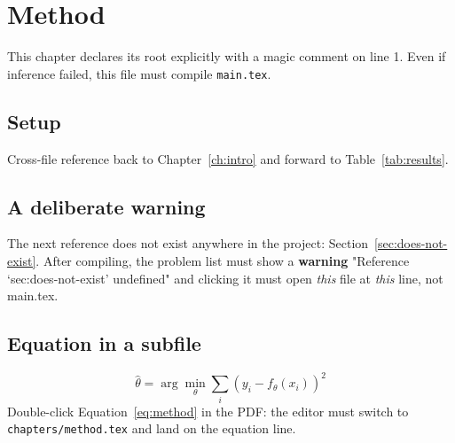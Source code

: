 \chapter{Method}\label{ch:method}

This chapter declares its root explicitly with a magic comment on line 1.
Even if inference failed, this file must compile \texttt{main.tex}.

\section{Setup}\label{sec:method-setup}
Cross-file reference back to Chapter~\ref{ch:intro} and forward to
Table~\ref{tab:results}.

\section{A deliberate warning}
The next reference does not exist anywhere in the project:
Section~\ref{sec:does-not-exist}. After compiling, the problem list must show a
\textbf{warning} "Reference `sec:does-not-exist' undefined" and clicking it must
open \emph{this} file at \emph{this} line, not main.tex.

\section{Equation in a subfile}
\begin{equation}\label{eq:method}
  \hat{\theta} = \arg\min_\theta \sum_i \left(y_i - f_\theta(x_i)\right)^2
\end{equation}
Double-click Equation~\eqref{eq:method} in the PDF: the editor must switch to
\texttt{chapters/method.tex} and land on the equation line.
